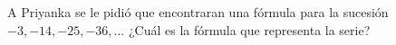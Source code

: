 \question[10] A Priyanka se le pidió que encontraran una fórmula para la sucesión $-3,-14,-25,-36, \dots$ 
¿Cu\'al es la f\'ormula que representa la serie? \fillin[$-3-11(n-1)$]
